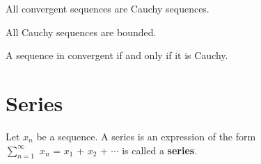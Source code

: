 \documentclass{report}
\begin{document}
\begin{theorem}
All convergent sequences are Cauchy sequences.
\end{theorem}

\begin{theorem}
All Cauchy sequences are bounded.
\end{theorem}

\begin{theorem}
A sequence in convergent if and only if it is Cauchy.
\end{theorem}

\section{Series}
\begin{definition}
Let $x_n$ be a sequence. A series is an expression of the form \\ 
$\sum_{n=1}^{\infty}$ $x_n$ = $x_1$ + $x_2$ + $\cdots$ is called a \textbf{series}.
\end{definition}
\end{document}
